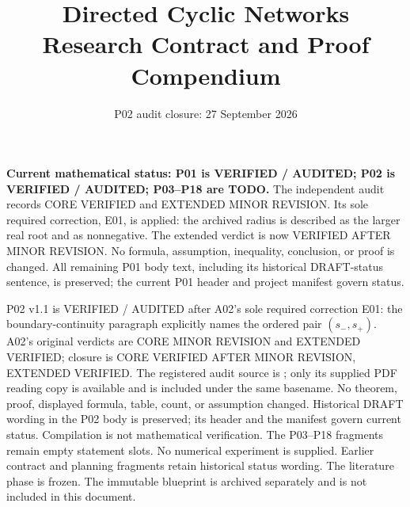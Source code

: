 \documentclass[11pt]{article}
\title{Directed Cyclic Networks\\Research Contract and Proof Compendium}
\author{}
\date{P02 audit closure: 27 September 2026}
\begin{document}
\maketitle
\noindent\textbf{Current mathematical status: P01 is VERIFIED / AUDITED;
P02 is VERIFIED / AUDITED; P03--P18 are TODO.} The independent audit
 records CORE VERIFIED
and EXTENDED MINOR REVISION. Its sole required correction, E01, is applied:
the archived radius is described as the larger real root and as nonnegative.
The extended verdict is now VERIFIED AFTER MINOR REVISION. No formula,
assumption, inequality, conclusion, or proof is changed. All remaining P01
body text, including its historical DRAFT-status sentence, is preserved;
the current P01 header and project manifest govern status.

\smallskip\noindent P02 v1.1 is VERIFIED / AUDITED after A02's sole required
correction E01: the boundary-continuity paragraph explicitly names the
ordered pair $(s_-,s_+)$. A02's original verdicts are CORE MINOR REVISION
and EXTENDED VERIFIED; closure is CORE VERIFIED AFTER MINOR REVISION,
EXTENDED VERIFIED. The registered audit source is
; only its supplied
PDF reading copy is available and is included under the same basename.
No theorem, proof, displayed formula, table, count, or assumption changed.
Historical DRAFT wording in the P02 body is preserved; its header and the
manifest govern current status. Compilation is not mathematical verification.
The P03--P18 fragments remain empty statement slots. No numerical experiment
is supplied.
Earlier contract and planning fragments retain historical status wording.
The literature phase is frozen. The immutable blueprint is archived
separately and is not included in this document.
\tableofcontents
\clearpage




\clearpage

\clearpage

\clearpage

\clearpage

\clearpage

\clearpage

\clearpage

\clearpage

\clearpage

\clearpage

\clearpage

\clearpage

\clearpage

\clearpage

\clearpage

\clearpage

\clearpage

\clearpage

\clearpage
\appendix




\end{document}
